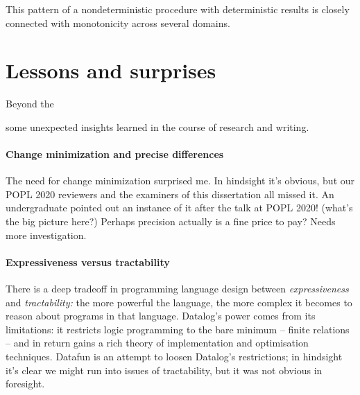 This pattern of a nondeterministic procedure with deterministic results is closely connected with monotonicity across several domains. \XXX



\section{Lessons and surprises}

Beyond the 

some unexpected insights learned in the course of research and writing.

\XXX

\paragraph{Change minimization and precise differences}

The need for change minimization surprised me. In hindsight it's obvious, but our POPL 2020 reviewers and the examiners of this dissertation all missed it. An undergraduate pointed out an instance of it after the talk at POPL 2020! (what's the big picture here?) Perhaps precision actually is a fine price to pay? Needs more investigation.

\paragraph{Expressiveness versus tractability}

There is a deep tradeoff in programming language design between
\emph{expressiveness} and \emph{tractability:} the more powerful the language,
the more complex it becomes to reason about programs in that language.
%
Datalog's power comes from its limitations: it restricts logic programming to
the bare minimum -- finite relations -- and in return gains a rich theory of
implementation and optimisation techniques. Datafun is an attempt to loosen
Datalog's restrictions; in hindsight it's clear we might run into issues of
tractability, but it was not obvious in foresight.


